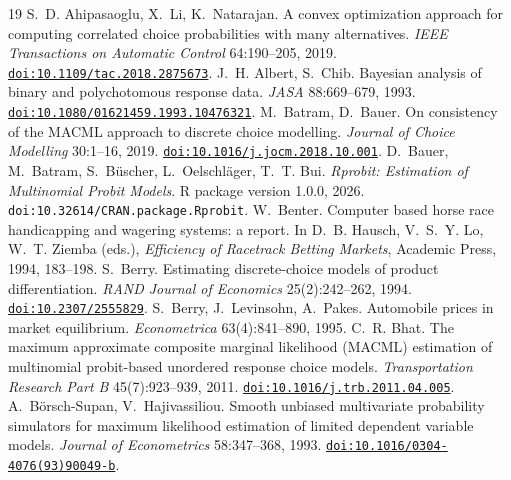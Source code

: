 \documentclass[11pt]{article}
\begin{document}
\begin{thebibliography}{19}\small
{} S.~D. Ahipasaoglu, X.~Li, K.~Natarajan. A
convex optimization approach for computing correlated choice
probabilities with many alternatives. \emph{IEEE Transactions on
Automatic Control} 64:190--205, 2019.
\href{https://doi.org/10.1109/tac.2018.2875673}{\nolinkurl{doi:10.1109/tac.2018.2875673}}.
 J.~H. Albert, S.~Chib.
Bayesian analysis of binary and polychotomous response data.
\emph{JASA} 88:669--679, 1993.
\href{https://doi.org/10.1080/01621459.1993.10476321}{\nolinkurl{doi:10.1080/01621459.1993.10476321}}.
 M.~Batram, D.~Bauer.
On consistency of the MACML approach to discrete choice modelling.
\emph{Journal of Choice Modelling} 30:1--16, 2019.
\href{https://doi.org/10.1016/j.jocm.2018.10.001}{\nolinkurl{doi:10.1016/j.jocm.2018.10.001}}.
 D.~Bauer, M.~Batram,
S.~B\"uscher, L.~Oelschl\"ager, T.~T. Bui. \emph{Rprobit: Estimation of
Multinomial Probit Models}. R package version 1.0.0, 2026.
\texttt{doi:10.32614/CRAN.package.Rprobit}.
 W.~Benter. Computer based horse
race handicapping and wagering systems: a report. In D.~B. Hausch,
V.~S.~Y. Lo, W.~T. Ziemba (eds.), \emph{Efficiency of Racetrack
Betting Markets}, Academic Press, 1994, 183--198.
 S.~Berry.
Estimating discrete-choice models of product differentiation.
\emph{RAND Journal of Economics} 25(2):242--262, 1994.
\href{https://doi.org/10.2307/2555829}{\nolinkurl{doi:10.2307/2555829}}.
S.~Berry, J.~Levinsohn, A.~Pakes. Automobile prices in market
equilibrium. \emph{Econometrica} 63(4):841--890, 1995.
 C.~R. Bhat.
The maximum approximate composite marginal likelihood (MACML) estimation of
multinomial probit-based unordered response choice models.
\emph{Transportation Research Part B} 45(7):923--939, 2011.
\href{https://doi.org/10.1016/j.trb.2011.04.005}{\nolinkurl{doi:10.1016/j.trb.2011.04.005}}.
A.~B\"orsch-Supan, V.~Hajivassiliou. Smooth unbiased multivariate probability
simulators for maximum likelihood estimation of limited dependent variable
models. \emph{Journal of Econometrics} 58:347--368, 1993.
\href{https://doi.org/10.1016/0304-4076(93)90049-b}{\nolinkurl{doi:10.1016/0304-4076(93)90049-b}}.

\end{thebibliography}
\end{document}
